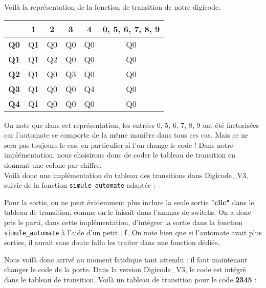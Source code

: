 \documentclass[10pt]{article}
\begin{document}
\begin{enumerate}[label=\textbf{[\alph*]}]
  

  \newpage
\item Voilà la représentation de la fonction de transition de notre
  digicode.

  \begin{center}
    \begin{tabular}{|l|c|c|c|c|c|}
      \hline
      & 1 & 2 & 3 & 4 & 0, 5, 6, 7, 8, 9 \\
      \hline
      \textbf{Q0} & Q1 & Q0 & Q0 & Q0 & Q0 \\
      \textbf{Q1} & Q1 & Q2 & Q0 & Q0 & Q0 \\
      \textbf{Q2} & Q1 & Q0 & Q3 & Q0 & Q0 \\
      \textbf{Q3} & Q1 & Q0 & Q0 & Q4 & Q0 \\
      \textbf{Q4} & Q1 & Q0 & Q0 & Q0 & Q0 \\
      \hline
    \end{tabular}
  \end{center}

  On note que dans cet représentation, les entrées 0, 5, 6, 7, 8, 9
  ont été factorisées car l'automate se comporte de la même manière
  dans tous ces cas. Mais ce ne sera pas toujours le cas, en
  particulier si l'on change le code ! Dans notre implémentation, nous
  choisirons donc de coder le tableau de transition en donnant une
  colone par chiffre. \\

  Voilà donc une implémentation du tableau des transitions dans
  Digicode\_V3, suivie de la fonction \texttt{simule\_automate}
  adaptée :

  \lstset{style=transitionc}
  

\item Pour la sortie, on ne peut évidemment plus inclure la seule
  sortie \textbf{"clic"} dans le tableau de transition, comme on le
  faisait dans l'ammas de switchs. On a donc pris le parti, dans cette
  implémentation, d'intégrer la sortie dans la fonction
  \texttt{simule\_automate} à l'aide d'un petit \texttt{if}. On note
  bien que si l'automate avait plus sorties, il aurait sans doute
  fallu les traiter dans une fonction dédiée.

\item Nous voilà donc arrivé au moment fatidique tant attendu : il
  faut maintenant changer le code de la porte. Dans la version
  Digicode\_V3, le code est intégré dans le tableau de
  transition. Voilà un tableau de transition pour le code
  \textbf{2345} :


\end{enumerate}
\end{document}
